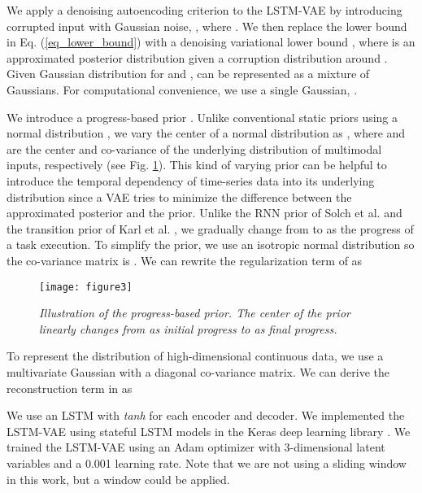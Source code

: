 \documentclass[letterpaper, 10 pt, conference]{ieeeconf}
\begin{document}
We apply a denoising autoencoding criterion \cite{vincent2008extracting} to the LSTM-VAE by introducing corrupted input with Gaussian noise, , where . We then replace the lower bound in Eq. (\ref{eq_lower_bound}) with a denoising variational lower bound  \cite{im2017denoising}, 
where  is an approximated posterior distribution given a corruption distribution around . Given Gaussian distribution for  and ,  can be represented as a mixture of Gaussians. For computational convenience, we use a single Gaussian, .


We introduce a progress-based prior . Unlike conventional static priors using a normal distribution , we vary the center of a normal distribution as , where  and  are the center and co-variance of the underlying distribution of multimodal inputs, respectively (see Fig. \ref{fig: progress_prior}). This kind of varying prior can be helpful to introduce the temporal dependency of time-series data into its underlying distribution since a VAE tries to minimize the difference between the approximated posterior and the prior. Unlike the RNN prior of Solch et al. \cite{solch2016variational} and the transition prior of Karl et al. \cite{karl2016deep}, we gradually change  from  to  as the progress of a task execution. To simplify the prior, we use an isotropic normal distribution so the co-variance matrix is . We can rewrite the regularization term of  as



\begin{figure}[t]
	\centering
	\texttt{[image: figure3]} 
	\caption{\textit{Illustration of the progress-based prior. The center of the prior linearly changes from  as initial progress to  as final progress.}}
	\label{fig: progress_prior}
    \vspace{-1.5em}
\end{figure}



To represent the distribution of high-dimensional continuous data, we use a multivariate Gaussian with a diagonal co-variance matrix. We can derive the reconstruction term in  as


We use an LSTM with \textit{tanh} for each encoder and decoder. We implemented the LSTM-VAE using stateful LSTM models in the Keras deep learning library \cite{chollet2015keras}. We trained the LSTM-VAE using an Adam optimizer with 3-dimensional latent variables and a 0.001 learning rate. Note that we are not using a sliding window in this work, but a window could be applied.
\end{document}
